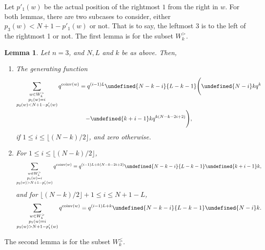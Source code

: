 \documentclass[11pt]{article}
\newtheorem{lemma}[theo]{Lemma}
\theoremstyle{definition}
\providecommand{\qbinom}[2]{\genfrac{[}{]}{0pt}{}{#1}{#2}}
\numberwithin{equation}{section}
\DeclareMathOperator{\coinv}{coinv}
\let\qbinom\undefined
\newcommand{\qbinom}[2]{\bgroup\renewcommand*{\arraystretch}{1}\begin{bmatrix} #1 \\ #2\end{bmatrix} \egroup}
\begin{document}
Let $p'_1(w)$ be the actual position of the rightmost $1$ from the right in $w$.
For both lemmas, there are two subcases to consider, either $p_3(w) < N+1 - p'_1(w)$ or not.
That is to say, the leftmost 3 is to the left of the rightmost 1 or not. The first lemma is for the subset $W_k^>$.

\begin{lemma}
\label{lem:quinv>}
Let $n=3$, and $N, L$ and $k$ be as above. Then, 
\begin{enumerate}[label=(\arabic*)]
\item \label{it3vvt1}
The generating function
\begin{multline}
\label{quinv>l}
\sum_{\substack{ w \in W_k^> \\ p_1(w) = i \\ p_3(w) < N+1 - p'_1(w)}} q^{\coinv(w)} = q^{ (i-1) L} 
\qbinom{N-k-i}{L-k-1} \Bigg( \qbinom {N-i}k q^k \\
 - \qbinom{k+i-1}k q^{k(N-k-2i+2)} \Bigg),
\end{multline}
if $1 \leq i \leq \lfloor (N-k)/2 \rfloor$, and zero otherwise.

\item \label{it3vvt2}
For $1 \leq i \leq \lfloor (N-k)/2 \rfloor$,
\begin{equation}
\label{quinv>r1}
\sum_{\substack{ w \in W_k^> \\ p_1(w) = i \\ p_3(w) > N+1 - p'_1(w)}} q^{\coinv(w)} = q^{ (i-1) L + k(N-k-2i+2)} 
\qbinom{N-k-i}{L-k-1} \qbinom{k+i-1}k,
\end{equation}
and for $\lfloor (N-k)/2 \rfloor + 1 \leq i \leq N +1 - L$,
\begin{equation}
\label{quinv>r2}
\sum_{\substack{ w \in W_k^> \\ p_1(w) = i \\ p_3(w) > N+1 - p'_1(w)}} q^{\coinv(w)} = q^{ (i-1) L + k} 
\qbinom{N-k-i}{L-k-1} \qbinom {N-i}k.
\end{equation}
\end{enumerate}
\end{lemma}

The second lemma is for the subset $W_k^\leq$.
\end{document}
